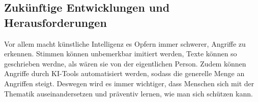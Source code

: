 \documentclass[12pt, a4paper, oneside]{scrartcl}
\begin{document}
\subsection{Zukünftige Entwicklungen und Herausforderungen}
Vor allem macht künstliche Intelligenz es Opfern immer schwerer, Angriffe zu erkennen. Stimmen können
unbemerkbar imitiert werden, Texte können so geschrieben werdne, als wären sie von der eigentlichen Person.
Zudem können Angriffe durch KI-Tools automatisiert werden, sodass die generelle Menge an Angriffen
steigt. Deswegen wird es immer wichtiger, dass Menschen sich mit der Thematik auseinandersetzen und präventiv
lernen, wie man sich schützen kann.

\clearpage
\printbibliography[title={Literaturverzeichnis}]
\end{document}
